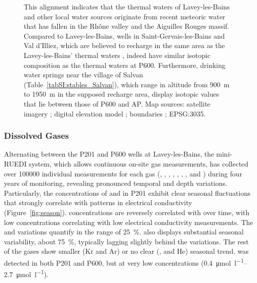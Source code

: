 \begin{figure}
{This alignment indicates that the thermal waters of Lavey-les-Bains and other local water sources originate from recent meteoric water that has fallen in the Rhône valley and the Aiguilles Rouges massif.
Compared to Lavey-les-Bains, wells in Saint-Gervais-les-Bains and Val d'Illiez, which are believed to recharge in the same area as the Lavey-les-Bains' thermal waters \parencite{sonney2010groundwater}, indeed have similar isotopic composition as the thermal waters at P600. 
Furthermore, drinking water springs near the village of Salvan (Table~\ref{tabSI:stables_Salvan}), which range in altitude from \SI{900}{\metre} to \SI{1950}{\metre} in the supposed recharge area, display isotopic values that lie between those of P600 and AP.
Map sources: satellite imagery \parencite{swisstopo2024swissimage}; digital elevation model \parencite{swisstopo2024swissalti3D}; boundaries \parencite{swisstopo2024landesgrenzen}; EPSG:3035.}
\label{fig:stables}
\end{figure}



\subsubsection{Dissolved Gases}
Alternating between the P201 and P600 wells at Lavey-les-Bains, the mini-RUEDI system, which allows continuous on-site gas measurements, has collected over \num{100000} individual measurements for each gas (, , , , , , , and ) during four years of monitoring, revealing pronounced temporal and depth variations.
Particularly, the concentrations of  and  in P201 exhibit clear seasonal fluctuations that strongly correlate with patterns in electrical conductivity (Figure~\ref{fig:season}).
 concentrations are reversely correlated with  over time, with low  concentrations correlating with low electrical conductivity measurements.
The  and  variations quantify in the range of \SI{25}{\percent}.
 also displays substantial seasonal variability, about \SI{75}{\percent}, typically lagging slightly behind the  variations.
The rest of the gases show smaller (Kr and Ar) or no clear (, and He) seasonal trend.
 was detected in both P201 and P600, but at very low concentrations (\SIrange{0.4}{2.7}{\umol\per\litre}).


\FloatBarrier %

